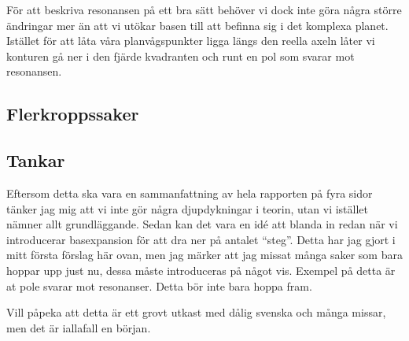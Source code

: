\documentclass[12pt,a4paper]{report}
\begin{document}
För att beskriva resonansen på ett bra sätt behöver vi dock inte göra några större ändringar mer än att vi utökar basen till att befinna sig i det komplexa planet.
Istället för att låta våra planvågspunkter ligga längs den reella axeln låter vi konturen gå ner i den fjärde kvadranten  och runt en pol som svarar mot resonansen.

\subsection{Flerkroppssaker}

\subsection{Tankar}
Eftersom detta ska vara en sammanfattning av hela rapporten på fyra sidor tänker jag mig att vi inte gör några djupdykningar i teorin, utan vi istället nämner allt grundläggande. Sedan kan det vara en idé att blanda in  redan när vi introducerar basexpansion för att dra ner på antalet ``steg''. Detta har jag gjort i mitt första förslag här ovan, men jag märker att jag missat många saker som bara hoppar upp just nu, dessa måste introduceras på något vis. Exempel på detta är at pole svarar mot resonanser. Detta bör inte bara hoppa fram.

Vill påpeka att detta är ett grovt utkast med dålig svenska och många missar, men det är iallafall en början.
\end{document}
